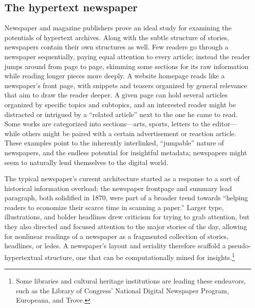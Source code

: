 \subsection{The hypertext newspaper}


Newspaper and magazine publishers prove an ideal study for examining the potentials of hypertext archives. Along with the subtle structure of stories, newspapers contain their own structures as well. Few readers go through a newspaper sequentially, paying equal attention to every article; instead the reader jumps around from page to page, skimming some sections for its raw information while reading longer pieces more deeply. A website homepage reads like a newspaper's front page, with snippets and teasers organized by general relevance that aim to draw the reader deeper. A given page can hold several articles organized by specific topics and subtopics, and an interested reader might be distracted or intrigued by a ``related article'' next to the one he came to read. Some works are categorized into sections---arts, sports, letters to the editor---while others might be paired with a certain advertisement or reaction article. These examples point to the inherently interlinked, ``jumpable'' nature of newspapers, and the endless potential for insightful metadata; newspapers might seem to naturally lend themselves to the digital world.

The typical newspaper's current architecture started as a response to a sort of historical information overload; the newspaper frontpage and summary lead paragraph, both solidified in 1870, were part of a broader trend towards ``helping readers to economize their scarce time in scanning a paper.''\autocite[254]{starr_creation_2004} Larger type, illustrations, and bolder headlines drew criticism for trying to grab attention, but they also directed and focused attention to the major stories of the day, allowing for nonlinear readings of a newspaper as a fragmented collection of stories, headlines, or ledes. A newspaper's layout and seriality therefore scaffold a pseudo-hypertextual structure, one that can be computationally mined for insights.\footnote{Some libraries and cultural heritage institutions are leading these endeavors, such as the Library of Congress' National Digital Newspaper Program, Europeana, and Trove.}

